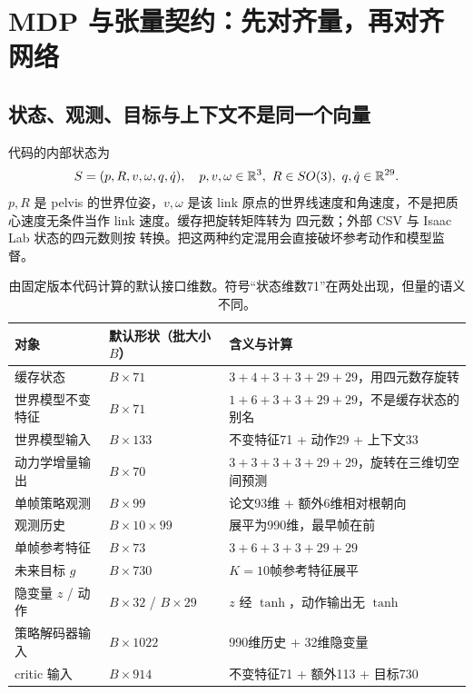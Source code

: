 \section{MDP 与张量契约：先对齐量，再对齐网络}\label{sec:interface}
\subsection{状态、观测、目标与上下文不是同一个向量}
代码的内部状态为
\begin{equation}
 S=(p,R,v,\omega,q,\dot q),\quad p,v,\omega\in\mathbb{R}^3,\ R\in SO(3),\ q,\dot q\in\mathbb{R}^{29}.
\end{equation}
$p,R$ 是 pelvis 的世界位姿，$v,\omega$ 是该 link 原点的世界线速度和角速度，不是把质心速度无条件当作 link 速度。缓存把旋转矩阵转为  四元数；外部 CSV 与 Isaac Lab 状态的四元数则按  转换。把这两种约定混用会直接破坏参考动作和模型监督。

\begin{table}[htbp]
\centering\small
\noindent\begin{tabularx}{\textwidth}{@{}P{36mm}P{27mm}Y@{}}
\toprule
对象 & 默认形状（批大小$B$） & 含义与计算\\
\midrule
缓存状态 & $B\times71$ & $3+4+3+3+29+29$，用四元数存旋转\\
世界模型不变特征 & $B\times71$ & $1+6+3+3+29+29$，不是缓存状态的别名\\
世界模型输入 & $B\times133$ & 不变特征71 + 动作29 + 上下文33\\
动力学增量输出 & $B\times70$ & $3+3+3+3+29+29$，旋转在三维切空间预测\\
单帧策略观测 & $B\times99$ & 论文93维 + 额外6维相对根朝向\\
观测历史 & $B\times10\times99$ & 展平为990维，最早帧在前\\
单帧参考特征 & $B\times73$ & $3+6+3+3+29+29$\\
未来目标 $g$ & $B\times730$ & $K=10$帧参考特征展平\\
隐变量 $z$ / 动作 & $B\times32$ / $B\times29$ & $z$ 经 $\tanh$，动作输出无 $\tanh$\\
策略解码器输入 & $B\times1022$ & 990维历史 + 32维隐变量\\
critic 输入 & $B\times914$ & 不变特征71 + 额外113 + 目标730\\
\bottomrule
\end{tabularx}
\caption{由固定版本代码计算的默认接口维数。符号“状态维数71”在两处出现，但量的语义不同。}
\end{table}

